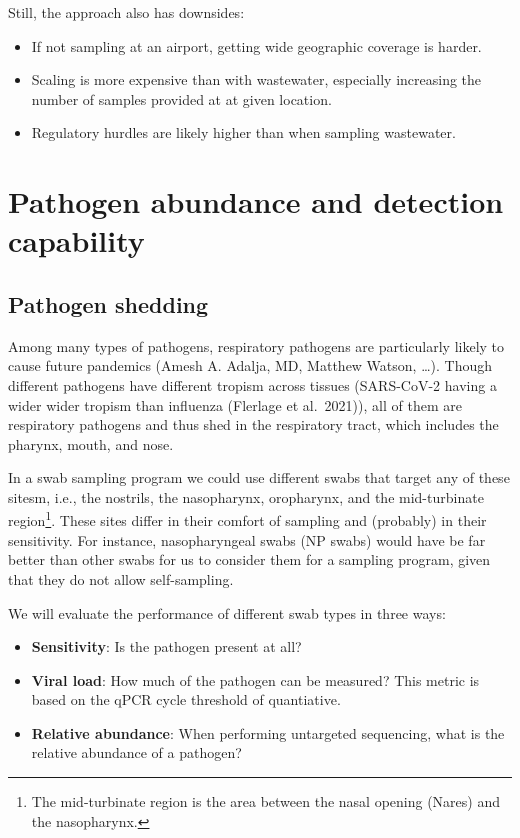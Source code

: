 \documentclass[
  letterpaper,
  DIV=11,
  numbers=noendperiod]{scrartcl}
\providecommand{\tightlist}{%
  \setlength{\itemsep}{0pt}\setlength{\parskip}{0pt}}\usepackage{longtable,booktabs,array}
\begin{document}
Still, the approach also has downsides:

\begin{itemize}
\tightlist
\item
  If not sampling at an airport, getting wide geographic coverage is
  harder.
\item
  Scaling is more expensive than with wastewater, especially increasing
  the number of samples provided at at given location.
\item
  Regulatory hurdles are likely higher than when sampling wastewater.
\end{itemize}

\section{Pathogen abundance and detection
capability}\label{pathogen-abundance-and-detection-capability}

\subsection{Pathogen shedding}\label{pathogen-shedding}

Among many types of pathogens, respiratory pathogens are particularly
likely to cause future pandemics (Amesh A. Adalja, MD, Matthew Watson,
\ldots). Though different pathogens have different tropism across
tissues (SARS-CoV-2 having a wider wider tropism than influenza
(Flerlage et al.~2021)), all of them are respiratory pathogens and thus
shed in the respiratory tract, which includes the pharynx, mouth, and
nose.

In a swab sampling program we could use different swabs that target any
of these sitesm, i.e., the nostrils, the nasopharynx, oropharynx, and
the mid-turbinate region\footnote{The mid-turbinate region is the area
  between the nasal opening (Nares) and the nasopharynx.}. These sites
differ in their comfort of sampling and (probably) in their sensitivity.
For instance, nasopharyngeal swabs (NP swabs) would have be far better
than other swabs for us to consider them for a sampling program, given
that they do not allow self-sampling.

We will evaluate the performance of different swab types in three ways:

\begin{itemize}
\tightlist
\item
  \textbf{Sensitivity}: Is the pathogen present at all?
\item
  \textbf{Viral load}: How much of the pathogen can be measured? This
  metric is based on the qPCR cycle threshold of quantiative.
\item
  \textbf{Relative abundance}: When performing untargeted sequencing,
  what is the relative abundance of a pathogen?
\end{itemize}
\end{document}

